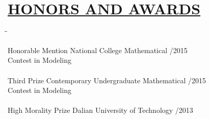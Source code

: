 \documentclass{res} %
\begin{document}
\begin{resume}
\begin{tabbing}
   \end{tabbing}\vspace{-22pt}      %
\vspace{-0.1in}
\section{\underline{HONORS AND AWARDS}}
   \vspace{-0.02in}		
   \begin{tabbing}
   \hspace{2.2in}\= \hspace{2.8in}\= \kill %

   Honorable Mention           \>National College Mathematical 		/2015\\
                  \>Contest in Modeling \ \\ \\
   Third Prize  \>Contemporary Undergraduate Mathematical /2015 \\
  \> Contest in Modeling\\ \\
   High Morality Prize     \>Dalian University of Technology  /2013\\
  
    \end{tabbing}\vspace{-22pt}      %
\end{resume}
\end{document}
